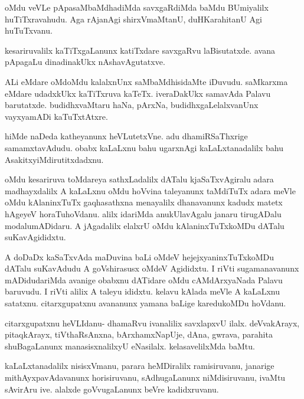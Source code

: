 \documentclass{article}
\begin{document}
\begin{mng}%
oMdu veVLe pApasaMbaMdhadiMda savxgaRdiMda baMdu BUmiyalilx 
huTiTxravahudu. Aga rAjanAgi shirxVmaMtanU, duHKarahitanU Agi 
huTuTxvanu.
\end{mng}

\begin{mng}%
kesariruvalilx kaTiTxgaLanunx katiTxdare savxgaRvu laBisutatxde. avana 
pApagaLu dinadinakUkx nAshavAgutatxve.
\end{mng}

\begin{mng}%
ALi eMdare oMdoMdu kalalxnUnx saMbaMdhisidaMte iDuvudu. saMkarxma 
eMdare udadxkUkx kaTiTxruva kaTeTx. iveraDakUkx samavAda Palavu 
barutatxde. budidhxvaMtaru haNa, pArxNa, budidhxgaLelalxvanUnx 
vayxyamADi kaTuTxtAtxre.
\end{mng}

\begin{mng}%
hiMde naDeda katheyanunx heVLutetxVne. adu dhamiRSaThxrige 
samamxtavAdudu. obabx kaLaLxnu bahu ugarxnAgi kaLaLxtanadalilx bahu 
AsakitxyiMdirutitxdadxnu.
\end{mng}

\begin{mng}%
oMdu kesariruva toMdareya sathxLadalilx dATalu kjaSaTxvAgiralu adara 
madhayxdalilx A kaLaLxnu oMdu hoVvina taleyanunx taMdiTuTx adara meVle 
oMdu kAlaninxTuTx gaqhasathxna menayalilx dhanavanunx kadudx matetx 
hAgeyeV horaTuhoVdanu. alilx idariMda anukUlavAgalu janaru tirugADalu 
modalumADidaru. A jAgadalilx elalxrU oMdu kAlaninxTuTxkoMDu dATalu 
suKavAgididxtu.
\end{mng}

\begin{mng}%
A doDaDx kaSaTxvAda maDuvina baLi oMdeV hejejxyaninxTuTxkoMDu dATalu 
suKavAdudu A goVshirasusx oMdeV Agididxtu. I riVti sugamanavanunx 
mADidudariMda avanige obabxnu dATidare oMdu cAMdArxyaNada Palavu 
baruvudu. I riVti alilix A taleyu ididxtu. kelavu kAlada meVle A 
kaLaLxnu satatxnu. citarxgupatxnu avananunx yamana baLige karedukoMDu 
hoVdanu.
\end{mng}

\begin{mng}%
citarxgupatxnu heVLIdanu- dhamaRvu ivanalilix savxlapxvU ilalx. 
deVvakArayx, pitaqkArayx, tiVthaRsAnxna, bArxhamxNapUje, dAna, gwrava, 
parahita shuBagaLanunx manasisxnalilxyU eNasilalx. kelasavelilxMda 
baMtu.
\end{mng}

\begin{mng}%
kaLaLxtanadalilx nisisxVmanu, parara heMDiralilx ramisiruvanu, 
janarige mithAyxpavAdavanunx horisiruvanu, sAdhugaLanunx 
niMdisiruvanu, ivaMtu sAvirAru ive. alalxde goVvugaLanunx beVre 
kadidxruvanu.
\end{mng}
\end{document}
